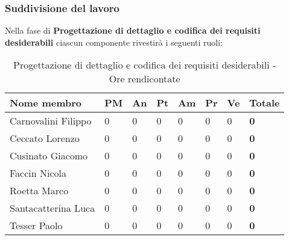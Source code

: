 		\subsubsection{Suddivisione del lavoro} %
		\label{ssub:suddivisione_del_lavoro}
		Nella fase di \textbf{Progettazione di dettaglio e codifica dei requisiti desiderabili} ciascun componente rivestirà i seguenti ruoli: \\
			\begin{table}[!h]
				\begin{center}
					\begin{tabularx}{0.9\textwidth}{|l|l|l|l|l|l|l|X|}
						\hline
						\textbf{Nome membro} & \textbf{PM} & \textbf{An} & \textbf{Pt} & \textbf{Am} & \textbf{Pr} & \textbf{Ve} & \textbf{Totale} \\
						\hline
						Carnovalini Filippo & 0 & 0 & 0 & 0 & 0 & 0 & \textbf{0} \\
						\hline
						Ceccato Lorenzo & 0 & 0 & 0 & 0 & 0 & 0 & \textbf{0} \\
						\hline
						Cusinato Giacomo & 0 & 0 & 0 & 0 & 0 & 0 & \textbf{0} \\
						\hline
						Faccin Nicola & 0 & 0 & 0 & 0 & 0 & 0 & \textbf{0} \\
						\hline
						Roetta Marco & 0 & 0 & 0 & 0 & 0 & 0 & \textbf{0} \\
						\hline
						Santacatterina Luca & 0 & 0 & 0 & 0 & 0 & 0 & \textbf{0} \\
						\hline
						Tesser Paolo & 0 & 0 & 0 & 0 & 0 & 0 & \textbf{0} \\
						\hline	
					\end{tabularx}
				\end{center}
			\caption{Progettazione di dettaglio e codifica dei requisiti desiderabili - Ore rendicontate}
			\end{table}
		

